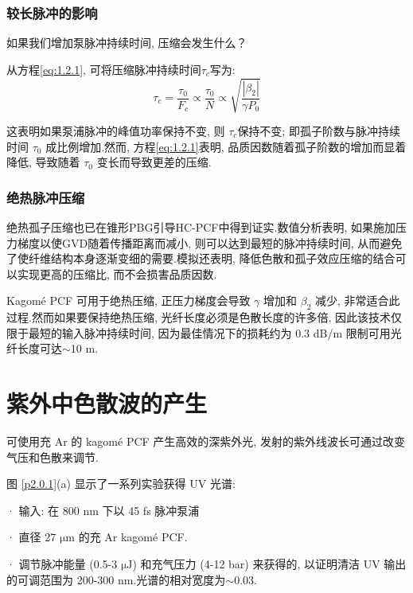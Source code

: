 \documentclass[14pt,a4paper,oneside]{article}
\numberwithin{equation}{subsection}             %
\numberwithin{figure}{subsection}               %
\begin{document}
\subsubsection{较长脉冲的影响}

如果我们增加泵脉冲持续时间, 压缩会发生什么？

从方程\ref{eq:1.2.1}, 可将压缩脉冲持续时间$\tau_{c}$写为: 
\begin{equation}
    \tau_c=\frac{\tau_0}{F_c}\propto\frac{\tau_0}N\propto\sqrt{\frac{|\beta_2|}{\gamma P_0}}
    \label{eq:1.2.2}
\end{equation}

这表明如果泵浦脉冲的峰值功率保持不变, 则 $\tau_{c}$保持不变; 即孤子阶数与脉冲持续时间 $\tau_{0}$ 成比例增加.然而, 方程\ref{eq:1.2.1}表明, 品质因数随着孤子阶数的增加而显着降低, 导致随着 $\tau_{0}$ 变长而导致更差的压缩.

\subsubsection{绝热脉冲压缩}

绝热孤子压缩\cite{kuehlSolitonsAxiallyNonuniform1988, traversOpticalPulseCompression2007, traversOpticalPulseCompression2007}也已在锥形PBG引导HC-PCF中得到证实\cite{geromeDeliverySub100fsPulses2007}.数值分析表明, 如果施加压力梯度以使GVD随着传播距离而减小, 则可以达到最短的脉冲持续时间\cite{laegsgaardTheoryAdiabaticPressuregradient2009}, 从而避免了使纤维结构本身逐渐变细的需要.模拟还表明, 降低色散和孤子效应压缩的结合可以实现更高的压缩比, 而不会损害品质因数.

Kagomé PCF 可用于绝热压缩, 正压力梯度会导致 $\gamma$ 增加和 $\beta_{2}$ 减少, 非常适合此过程.然而如果要保持绝热压缩, 光纤长度必须是色散长度的许多倍, 因此该技术仅限于最短的输入脉冲持续时间, 因为最佳情况下的损耗约为 0.3 dB/m 限制可用光纤长度可达$\sim$10 m.

\section{紫外中色散波的产生}

可使用充 Ar 的 kagomé PCF 产生高效的深紫外光, 发射的紫外线波长可通过改变气压和色散来调节.

图 \ref{p2.0.1}(a) 显示了一系列实验获得 UV 光谱: 

· 输入: 在 800 nm 下以 45 fs 脉冲泵浦

· 直径 27 $\mathrm{\mu m}$ 的充 Ar kagomé PCF.

· 调节脉冲能量 (0.5-3 $\mathrm{\mu J}$) 和充气压力 (4-12 bar) 来获得的, 以证明清洁 UV 输出的可调范围为 200-300 nm.光谱的相对宽度为$\sim$0.03.
\end{document}
